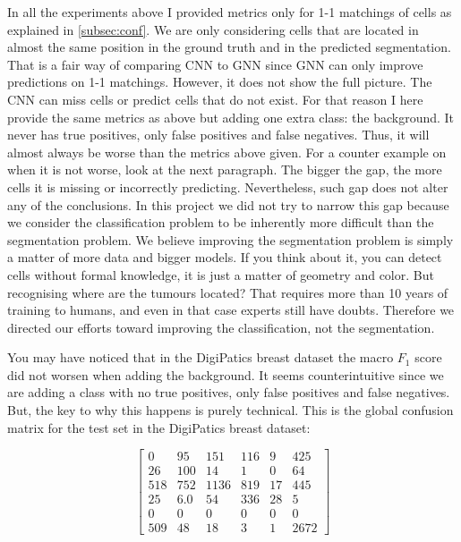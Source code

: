 In all the experiments above I provided metrics only for 1-1 matchings of cells as explained in \autoref{subsec:conf}. We are only considering cells that are located in almost the same position in the ground truth and in the predicted segmentation. That is a fair way of comparing CNN to GNN since GNN can only improve predictions on 1-1 matchings. However, it does not show the full picture. The CNN can miss cells or predict cells that do not exist. For that reason I here provide the same metrics as above but adding one extra class: the background. It never has true positives, only false positives and false negatives. Thus, it will almost always be worse than the metrics above given. For a counter example on when it is not worse, look at the next paragraph. The bigger the gap, the more cells it is missing or incorrectly predicting. Nevertheless, such gap does not alter any of the conclusions. In this project we did not try to narrow this gap because we consider the classification problem to be inherently more difficult than the segmentation problem. We believe improving the segmentation problem is simply a matter of more data and bigger models. If you think about it, you can detect cells without formal knowledge, it is just a matter of geometry and color. But recognising where are the tumours located? That requires more than 10 years of training to humans, and even in that case experts still have doubts. Therefore we directed our efforts toward improving the classification, not the segmentation.

You may have noticed that in the DigiPatics breast dataset the macro $F_1$ score did not worsen when adding the background. It seems counterintuitive since we are adding a class with no true positives, only false positives and false negatives. But, the key to why this happens is purely technical. This is the global confusion matrix for the test set in the DigiPatics breast dataset:

\[
\begin{bmatrix}
0 & 95 & 151 & 116 & 9 & 425 \\
26 & 100 & 14 & 1 & 0 & 64 \\
518 & 752 & 1136 & 819 & 17 & 445 \\
25 & 6.0 & 54 & 336 & 28 & 5 \\
0 & 0 & 0 & 0 & 0 & 0 \\
509 & 48 & 18 & 3 & 1 & 2672
\end{bmatrix}
\]

